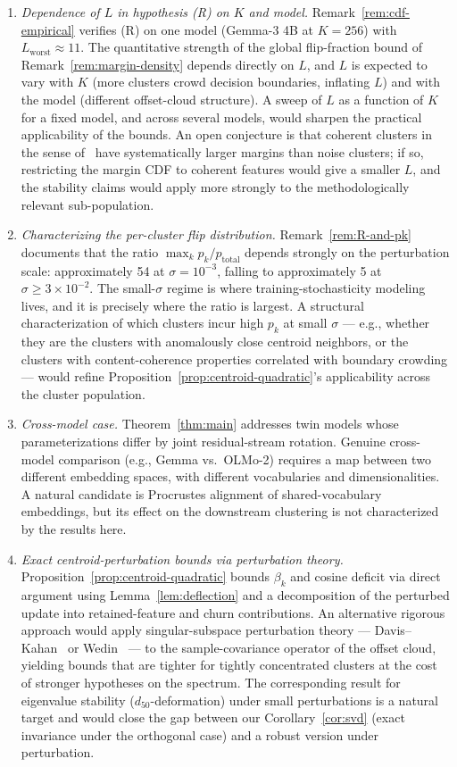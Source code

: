 \documentclass[11pt,letterpaper]{article}
\theoremstyle{definition}
\begin{document}
\begin{enumerate}[label=\arabic*., leftmargin=*, itemsep=1pt]
\item \emph{Dependence of $L$ in hypothesis (R) on $K$ and model.} Remark~\ref{rem:cdf-empirical} verifies (R) on one model (Gemma-3 4B at $K = 256$) with $L_{\mathrm{worst}} \approx 11$. The quantitative strength of the global flip-fraction bound of Remark~\ref{rem:margin-density} depends directly on $L$, and $L$ is expected to vary with $K$ (more clusters crowd decision boundaries, inflating $L$) and with the model (different offset-cloud structure). A sweep of $L$ as a function of $K$ for a fixed model, and across several models, would sharpen the practical applicability of the bounds. An open conjecture is that coherent clusters in the sense of~\citep{cluster_size_confound} have systematically larger margins than noise clusters; if so, restricting the margin CDF to coherent features would give a smaller $L$, and the stability claims would apply more strongly to the methodologically relevant sub-population.
\item \emph{Characterizing the per-cluster flip distribution.} Remark~\ref{rem:R-and-pk} documents that the ratio $\max_k p_k / p_{\mathrm{total}}$ depends strongly on the perturbation scale: approximately 54 at $\sigma = 10^{-3}$, falling to approximately 5 at $\sigma \geq 3 \times 10^{-2}$. The small-$\sigma$ regime is where training-stochasticity modeling lives, and it is precisely where the ratio is largest. A structural characterization of which clusters incur high $p_k$ at small $\sigma$ --- e.g., whether they are the clusters with anomalously close centroid neighbors, or the clusters with content-coherence properties correlated with boundary crowding --- would refine Proposition~\ref{prop:centroid-quadratic}'s applicability across the cluster population.
\item \emph{Cross-model case.} Theorem~\ref{thm:main} addresses twin models whose parameterizations differ by joint residual-stream rotation. Genuine cross-model comparison (e.g., Gemma vs.\ OLMo-2) requires a map between two different embedding spaces, with different vocabularies and dimensionalities. A natural candidate is Procrustes alignment of shared-vocabulary embeddings, but its effect on the downstream clustering is not characterized by the results here.
\item \emph{Exact centroid-perturbation bounds via perturbation theory.} Proposition~\ref{prop:centroid-quadratic} bounds $\beta_k$ and cosine deficit via direct argument using Lemma~\ref{lem:deflection} and a decomposition of the perturbed update into retained-feature and churn contributions. An alternative rigorous approach would apply singular-subspace perturbation theory --- Davis--Kahan~\citep{davis_kahan_1970} or Wedin~\citep{wedin_1972} --- to the sample-covariance operator of the offset cloud, yielding bounds that are tighter for tightly concentrated clusters at the cost of stronger hypotheses on the spectrum. The corresponding result for eigenvalue stability ($d_{50}$-deformation) under small perturbations is a natural target and would close the gap between our Corollary~\ref{cor:svd} (exact invariance under the orthogonal case) and a robust version under perturbation.

\end{enumerate}
\end{document}
